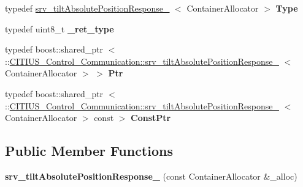 \begin{DoxyCompactItemize}
\item 
\hypertarget{struct_c_i_t_i_u_s___control___communication_1_1srv__tilt_absolute_position_response___ad43b0a937026a73ef1c6586287b2057d}{typedef \*
\hyperlink{struct_c_i_t_i_u_s___control___communication_1_1srv__tilt_absolute_position_response__}{srv\-\_\-tilt\-Absolute\-Position\-Response\-\_\-}\*
$<$ \-Container\-Allocator $>$ {\bfseries \-Type}}\label{struct_c_i_t_i_u_s___control___communication_1_1srv__tilt_absolute_position_response___ad43b0a937026a73ef1c6586287b2057d}

\item 
\hypertarget{struct_c_i_t_i_u_s___control___communication_1_1srv__tilt_absolute_position_response___a2fe53e531fc55a078ed022cd1e544983}{typedef uint8\-\_\-t {\bfseries \-\_\-ret\-\_\-type}}\label{struct_c_i_t_i_u_s___control___communication_1_1srv__tilt_absolute_position_response___a2fe53e531fc55a078ed022cd1e544983}

\item 
\hypertarget{struct_c_i_t_i_u_s___control___communication_1_1srv__tilt_absolute_position_response___a85bf2981b4201036c39bd81aa590803d}{typedef boost\-::shared\-\_\-ptr\*
$<$ \-::\hyperlink{struct_c_i_t_i_u_s___control___communication_1_1srv__tilt_absolute_position_response__}{\-C\-I\-T\-I\-U\-S\-\_\-\-Control\-\_\-\-Communication\-::srv\-\_\-tilt\-Absolute\-Position\-Response\-\_\-}\*
$<$ \-Container\-Allocator $>$ $>$ {\bfseries \-Ptr}}\label{struct_c_i_t_i_u_s___control___communication_1_1srv__tilt_absolute_position_response___a85bf2981b4201036c39bd81aa590803d}

\item 
\hypertarget{struct_c_i_t_i_u_s___control___communication_1_1srv__tilt_absolute_position_response___a8db66d90f43c03d30b595eed494e935d}{typedef boost\-::shared\-\_\-ptr\*
$<$ \-::\hyperlink{struct_c_i_t_i_u_s___control___communication_1_1srv__tilt_absolute_position_response__}{\-C\-I\-T\-I\-U\-S\-\_\-\-Control\-\_\-\-Communication\-::srv\-\_\-tilt\-Absolute\-Position\-Response\-\_\-}\*
$<$ \-Container\-Allocator $>$ const  $>$ {\bfseries \-Const\-Ptr}}\label{struct_c_i_t_i_u_s___control___communication_1_1srv__tilt_absolute_position_response___a8db66d90f43c03d30b595eed494e935d}

\end{DoxyCompactItemize}
\subsection*{\-Public \-Member \-Functions}
\begin{DoxyCompactItemize}
\item 
\hypertarget{struct_c_i_t_i_u_s___control___communication_1_1srv__tilt_absolute_position_response___a4939306d8f8409e7f61f98a81bbf8c0c}{{\bfseries srv\-\_\-tilt\-Absolute\-Position\-Response\-\_\-} (const \-Container\-Allocator \&\-\_\-alloc)}\label{struct_c_i_t_i_u_s___control___communication_1_1srv__tilt_absolute_position_response___a4939306d8f8409e7f61f98a81bbf8c0c}

\end{DoxyCompactItemize}
